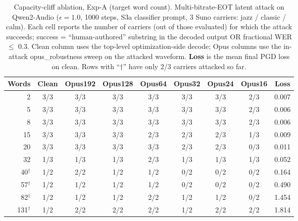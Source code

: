 \begin{table}[t]
\centering
\small
\caption{Capacity-cliff ablation, Exp-A (target word count). Multi-bitrate-EOT latent attack on Qwen2-Audio ($\epsilon{=}1.0$, 1000 steps, S3a classifier prompt, 3 Suno carriers: jazz / classic / calm). Each cell reports the number of carriers (out of those evaluated) for which the attack succeeds; success = ``human-authored'' substring in the decoded output OR fractional WER $\leq$ 0.3. Clean column uses the top-level optimization-side decode; Opus columns use the in-attack opus\_robustness sweep on the attacked waveform. \textbf{Loss} is the mean final PGD loss on clean. Rows with ``$\dagger$'' have only 2/3 carriers attacked so far.}
\label{tab:capacity_expA}
\setlength{\tabcolsep}{4pt}
\begin{tabular}{rcccccccc}
\toprule
\textbf{Words} & \textbf{Clean} & \textbf{Opus192} & \textbf{Opus128} & \textbf{Opus64} & \textbf{Opus32} & \textbf{Opus24} & \textbf{Opus16} & \textbf{Loss} \\
\midrule
2 & 3/3 & 3/3 & 3/3 & 3/3 & 3/3 & 3/3 & 2/3 & 0.007 \\
5 & 3/3 & 3/3 & 3/3 & 3/3 & 3/3 & 3/3 & 2/3 & 0.006 \\
8 & 3/3 & 3/3 & 3/3 & 3/3 & 3/3 & 3/3 & 2/3 & 0.006 \\
15 & 3/3 & 3/3 & 3/3 & 2/3 & 2/3 & 2/3 & 1/3 & 0.009 \\
20 & 3/3 & 3/3 & 3/3 & 3/3 & 2/3 & 2/3 & 0/3 & 0.011 \\
32 & 1/3 & 1/3 & 1/3 & 2/3 & 1/3 & 1/3 & 1/3 & 0.052 \\
40$^{\dagger}$ & 1/2 & 2/2 & 1/2 & 1/2 & 0/2 & 0/2 & 0/2 & 0.164 \\
57$^{\dagger}$ & 1/2 & 1/2 & 1/2 & 1/2 & 0/2 & 0/2 & 0/2 & 0.490 \\
82$^{\dagger}$ & 1/2 & 1/2 & 1/2 & 2/2 & 1/2 & 1/2 & 0/2 & 1.454 \\
131$^{\dagger}$ & 1/2 & 2/2 & 2/2 & 2/2 & 1/2 & 2/2 & 2/2 & 1.814 \\
\bottomrule
\end{tabular}
\end{table}
